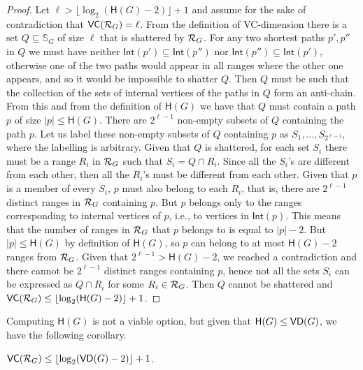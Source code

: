 \begin{proof}
Let $\ell>\lfloor\log_2(\mathsf{H}(G)-2)\rfloor+1$ and assume for the sake of contradiction
that $\mathsf{VC}(\mathcal{R}_G)=\ell$. From the definition of VC-dimension there is a set
$Q\subseteq\mathbb{S}_G$ of size $\ell$ that is shattered by $\mathcal{R}_G$. 
For any two shortest paths $p',p''$ in $Q$ we must have neither
$\mathsf{Int}(p')\subseteq\mathsf{Int}(p'')$ nor
$\mathsf{Int}(p'')\subseteq\mathsf{Int}(p')$, otherwise one of the two paths
would appear in all ranges where the other one appears, and so it would be
impossible to shatter $Q$. Then $Q$ must be such that the collection of the
sets of internal vertices of the paths in $Q$ form an anti-chain. From this and
from the definition of $\mathsf{H}(G)$ we have that $Q$ must contain a path $p$ of
size $|p|\le\mathsf{H}(G)$. There are  $2^{\ell-1}$ non-empty subsets of
$Q$ containing the path $p$. Let us label these non-empty subsets of $Q$ containing $p$ as
$S_1,\dotsc,S_{2^{\ell-1}}$, where the labelling is arbitrary.
Given that $Q$ is shattered, for each set $S_i$ there must be a range $R_i$ in
$\mathcal{R}_G$ such that $S_i=Q\cap R_i$. Since all the $S_i$'s are
different from each other, then all the $R_i$'s must be different from each
other. Given that $p$ is a member of every $S_i$, $p$ must also belong to each
$R_i$, that is, there are $2^{\ell-1}$ distinct ranges in $\mathcal{R}_G$ containing
$p$. But $p$ belongs only to the ranges corresponding to internal vertices of
$p$, i.e., to vertices in $\mathsf{Int}(p)$. This means that the number of ranges
in $\mathcal{R}_G$ that $p$ belongs to is equal to $|p|-2$. But $|p|\le\mathsf{H}(G)$ by
definition of $\mathsf{H}(G)$, so $p$
can belong to at most $\mathsf{H}(G)-2$ ranges from $\mathcal{R}_G$. Given that
$2^{\ell-1}>\mathsf{H}(G)-2$, we reached a contradiction and there cannot be $2^{\ell-1}$
distinct ranges containing $p$, hence not all the sets $S_i$ can be expressed as
$Q\cap R_i$ for some $R_i\in\mathcal{R}_G$. Then $Q$ cannot be shattered and
$\mathsf{VC}(\mathcal{R}_G)\le\lfloor\log_2(\mathsf{H}(G)-2)\rfloor+1$.
\end{proof}

Computing $\mathsf{H}(G)$ is not a viable option, but given that
$\mathsf{H}(G)\le\mathsf{VD}(G)$, we have the following corollary.

\begin{corollary}\label{corol:vcdimuppbound}
  $\mathsf{VC}(\mathcal{R}_G)\le\lfloor\log_2(\mathsf{VD}(G)-2)\rfloor+1$.
\end{corollary}

